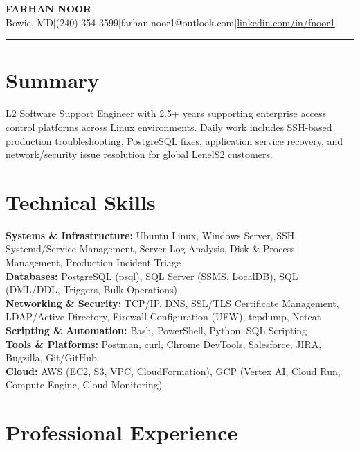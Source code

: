 \documentclass[9.5pt, letterpaper]{extarticle}
\newcommand{\skillline}[2]{%
  \textbf{#1:} #2
}
\begin{document}
\begin{center}
  {\fontsize{14}{16}\selectfont\bfseries FARHAN NOOR}\\[3pt]
  {\fontsize{9}{11}\selectfont Bowie, MD\enspace|\enspace(240) 354-3599\enspace|\enspace farhan.noor1@outlook.com\enspace|\enspace\href{https://linkedin.com/in/fnoor1}{linkedin.com/in/fnoor1}}
\end{center}
\vspace{-4pt}
{\color{headingblue}\rule{\textwidth}{1.2pt}}

\section{Summary}
L2 Software Support Engineer with 2.5+ years supporting enterprise access control platforms across Linux environments. Daily work includes SSH-based production troubleshooting, PostgreSQL fixes, application service recovery, and network/security issue resolution for global LenelS2 customers.

\section{Technical Skills}
\skillline{Systems \& Infrastructure}{Ubuntu Linux, Windows Server, SSH, Systemd/Service Management, Server Log Analysis, Disk \& Process Management, Production Incident Triage}\\
\skillline{Databases}{PostgreSQL (psql), SQL Server (SSMS, LocalDB), SQL (DML/DDL, Triggers, Bulk Operations)}\\
\skillline{Networking \& Security}{TCP/IP, DNS, SSL/TLS Certificate Management, LDAP/Active Directory, Firewall Configuration (UFW), tcpdump, Netcat}\\
\skillline{Scripting \& Automation}{Bash, PowerShell, Python, SQL Scripting}\\
\skillline{Tools \& Platforms}{Postman, curl, Chrome DevTools, Salesforce, JIRA, Bugzilla, Git/GitHub}\\
\skillline{Cloud}{AWS (EC2, S3, VPC, CloudFormation), GCP (Vertex AI, Cloud Run, Compute Engine, Cloud Monitoring)}

\section{Professional Experience}
\end{document}
